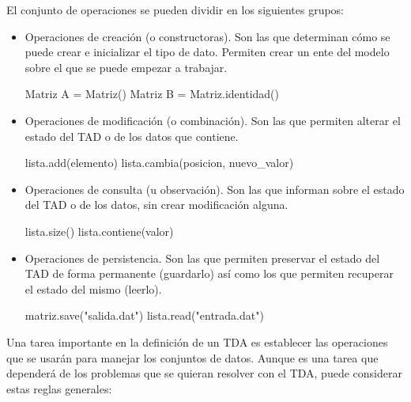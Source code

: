 El conjunto de operaciones se pueden dividir en los siguientes grupos:
\begin{itemize}
\item Operaciones de creación (o constructoras). Son las que determinan cómo se puede crear e inicializar el tipo de dato. Permiten crear un ente del modelo sobre el que se puede empezar a trabajar.
\begin{pyverbatim}
Matriz A = Matriz()
Matriz B = Matriz.identidad()
\end{pyverbatim}

\item Operaciones de modificación (o  combinación). Son las que permiten alterar el estado del TAD o de los datos que contiene.
\begin{pyverbatim}
lista.add(elemento)
lista.cambia(posicion, nuevo_valor)
\end{pyverbatim}

\item Operaciones de consulta (u observación).  Son las que informan sobre el estado del TAD o de los datos, sin crear modificación alguna.

\begin{pyverbatim}
lista.size()
lista.contiene(valor)
\end{pyverbatim}


\item Operaciones de persistencia. Son las que permiten preservar el estado del TAD de forma permanente (guardarlo) así como los que permiten recuperar el estado del mismo (leerlo). 
\begin{pyverbatim}
matriz.save("salida.dat")
lista.read("entrada.dat")
\end{pyverbatim}
\end{itemize}





Una tarea importante en la definición de un TDA es establecer las operaciones que se usarán para manejar los conjuntos de datos. Aunque es una tarea que dependerá de los problemas que se quieran resolver con el TDA, puede considerar estas reglas generales:

